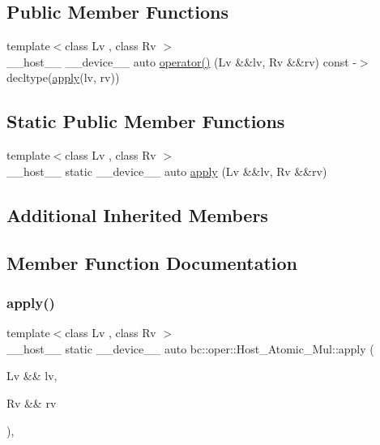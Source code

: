 \subsection*{Public Member Functions}
\begin{DoxyCompactItemize}
\item 
{\footnotesize template$<$class Lv , class Rv $>$ }\\\+\_\+\+\_\+host\+\_\+\+\_\+ \+\_\+\+\_\+device\+\_\+\+\_\+ auto \hyperlink{structbc_1_1oper_1_1Host__Atomic__Mul_ae130231ab99206064ad16e2008e9ac6b}{operator()} (Lv \&\&lv, Rv \&\&rv) const -\/$>$ decltype(\hyperlink{structbc_1_1oper_1_1Host__Atomic__Mul_aebf2a0c5db43312f9a9882a43823540c}{apply}(lv, rv))
\end{DoxyCompactItemize}
\subsection*{Static Public Member Functions}
\begin{DoxyCompactItemize}
\item 
{\footnotesize template$<$class Lv , class Rv $>$ }\\\+\_\+\+\_\+host\+\_\+\+\_\+ static \+\_\+\+\_\+device\+\_\+\+\_\+ auto \hyperlink{structbc_1_1oper_1_1Host__Atomic__Mul_aebf2a0c5db43312f9a9882a43823540c}{apply} (Lv \&\&lv, Rv \&\&rv)
\end{DoxyCompactItemize}
\subsection*{Additional Inherited Members}


\subsection{Member Function Documentation}
\mbox{\label{structbc_1_1oper_1_1Host__Atomic__Mul_aebf2a0c5db43312f9a9882a43823540c}} 
\subsubsection{\texorpdfstring{apply()}{apply()}}
{\footnotesize\ttfamily template$<$class Lv , class Rv $>$ \\
\+\_\+\+\_\+host\+\_\+\+\_\+ static \+\_\+\+\_\+device\+\_\+\+\_\+ auto bc\+::oper\+::\+Host\+\_\+\+Atomic\+\_\+\+Mul\+::apply (\begin{DoxyParamCaption}\item[{Lv \&\&}]{lv,  }\item[{Rv \&\&}]{rv }\end{DoxyParamCaption})\hspace{0.3cm}{\ttfamily [inline]}, {\ttfamily [static]}}

